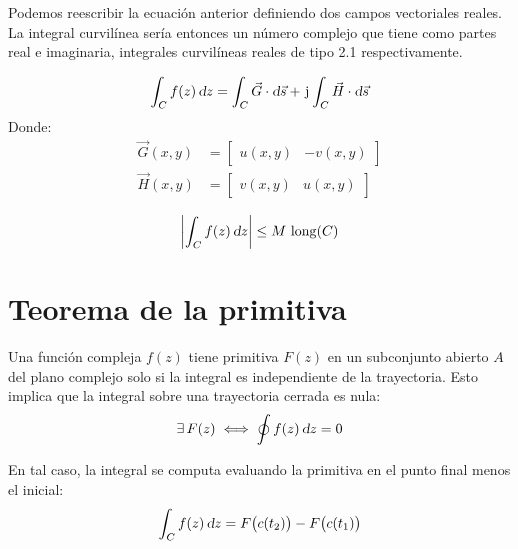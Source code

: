 Podemos reescribir la ecuación anterior definiendo dos campos vectoriales reales.
La integral curvilínea sería entonces un número complejo que tiene como partes real e imaginaria, integrales curvilíneas reales de tipo 2.1 respectivamente.

\begin{mdframed}[style=DefinitionFrame]
    \begin{defn}
        \label{defn:integral}
    \end{defn}
    \begin{equation*}
        \int_{C} f(z) \, \textsl{d} z = \int_{C} \Vec{G} \cdot \textsl{d} \Vec{s} + \mkern2mu\mathrm{j}\mkern1mu \int_{C} \Vec{H} \cdot \textsl{d} \Vec{s}
    \end{equation*}
    Donde:
    \begin{align*}
        \Vec{G}(x,y) &= \begin{bmatrix} u(x,y) & -v(x,y) \end{bmatrix}
        \\
        \Vec{H}(x,y) &= \begin{bmatrix} v(x,y) & u(x,y) \end{bmatrix}
    \end{align*}
\end{mdframed}

\begin{mdframed}[style=PropertyFrame]
    \begin{prop}
    \end{prop}
    \begin{equation*}
        {\left| {\int_C f(z) \, \textsl{d}z} \right|} \leq M \, \operatorname{long}(C)
    \end{equation*}
\end{mdframed}


\section{Teorema de la primitiva}
\label{sec:primitive}

Una función compleja $f(z)$ tiene primitiva $F(z)$ en un subconjunto abierto $A$ del plano complejo solo si la integral es independiente de la trayectoria.
Esto implica que la integral sobre una trayectoria cerrada es nula:
\begin{equation*}
    \exists \, F(z) \iff \oint f(z) \, \textsl{d} z = 0
\end{equation*}

En tal caso, la integral se computa evaluando la primitiva en el punto final menos el inicial:
\begin{equation*}
    \int_C f(z) \, \textsl{d} z = F \big( c(t_2) \big) - F \big( c(t_1) \big)
\end{equation*}


